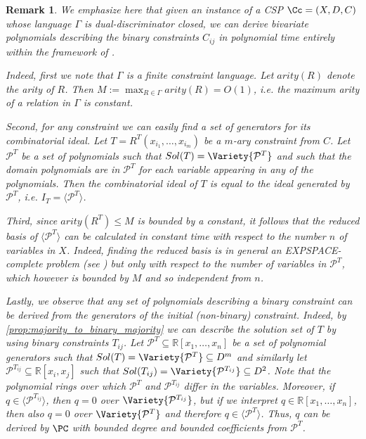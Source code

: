 \documentclass[11pt]{article}
\newtheorem{remark}[theorem]{Remark}
\begin{document}
\begin{remark} \label{rmrk:binary_constraints_bounded_derivations} 
    We emphasize here that given an instance of a CSP $\Cc = (X,D,C)$ whose language $\Gamma$ is dual-discriminator closed, we can derive bivariate polynomials describing the binary constraints $C_{ij}$ in polynomial time entirely within the framework of \PC. 
    
    Indeed, first we note that $\Gamma$ is a \emph{finite} constraint language. Let $arity(R)$ denote the arity of $R$. Then $M := \max_{R \in \Gamma} arity(R) = O(1)$, i.e. the maximum arity of a relation in $\Gamma$ is constant. 
    
    Second, for any constraint we can easily find a set of generators for its combinatorial ideal. Let $T = R^{T}(x_{i_1}, \ldots, x_{i_m})$ be a $m$-ary constraint from $C$. Let $\mathcal{P}^{T}$ be a set of polynomials such that $Sol(T) = \Variety{\mathcal{P}^{T}}$ and such that the domain polynomials are in $\mathcal{P}^{T}$ for each variable appearing in any of the polynomials. Then the combinatorial ideal of $T$ is equal to the ideal generated by $\mathcal{P}^{T}$, i.e. $I_T = \langle \mathcal{P}^{T} \rangle$. 
    
    Third, since $arity(R^{T}) \leq M$ is bounded by a constant, it follows that the reduced \GB basis of $\langle \mathcal{P}^{T} \rangle$ can be calculated in constant time with respect to the number $n$ of variables in $X$. Indeed, finding the reduced \GB basis is in general an EXPSPACE-complete problem (see \cite{MAYR1982305, Mayr1989}) but only with respect to the number of variables in $\mathcal{P}^{T}$, which however is bounded by $M$ and so independent from $n$.

    Lastly, we observe that any set of polynomials describing a binary constraint can be derived from the generators of the initial (non-binary) constraint. Indeed, by \cref{prop:majority_to_binary_majority} we can describe the solution set of $T$ by using binary constraints $T_{ij}$. Let $\mathcal{P}^{T} \subseteq \mathbb{R}[x_1, \dots, x_n]$ be a set of polynomial generators such that $Sol(T) = \Variety{\mathcal{P}^{T}} \subseteq D^m$ and similarly let $\mathcal{P}^{T_{ij}} \subseteq \mathbb{R}[x_i,x_j]$ such that $Sol(T_{ij}) = \Variety{\mathcal{P}^{T_{ij}}} \subseteq D^2$. Note that the polynomial rings over which $\mathcal{P}^{T}$ and $\mathcal{P}^{T_{ij}}$ differ in the variables. Moreover, if $q \in \langle \mathcal{P}^{T_{ij}} \rangle$, then $q = 0$ over $\Variety{\mathcal{P}^{T_{ij}}}$, but if we interpret $q \in \mathbb{R}[x_1, \dots, x_n]$, then also $q = 0$ over $\Variety{\mathcal{P}^{T}}$ and therefore $q \in \langle \mathcal{P}^{T} \rangle$. Thus, $q$ can be derived by $\PC$ with bounded degree and bounded coefficients from $\mathcal{P}^{T}$.


\end{remark}
\end{document}
